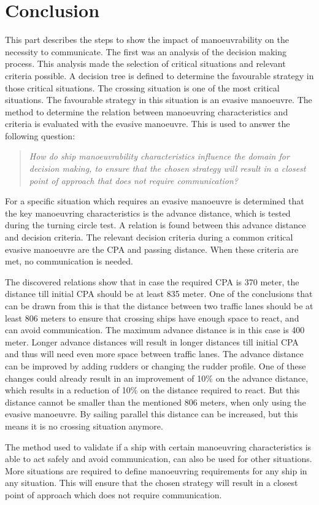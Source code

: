 \chapter{Conclusion}
This part describes the steps to show the impact of manoeuvrability on the necessity to communicate. The first was an analysis of the decision making process. This analysis made the selection of critical situations and relevant criteria possible.
A decision tree is defined to determine the favourable strategy in those critical situations. The crossing situation is one of the most critical situations. The favourable strategy in this situation is an evasive manoeuvre. The method to determine the relation between manoeuvring characteristics and criteria is evaluated with the evasive manoeuvre.
This is used to answer the following question:

\begin{quotation}
	\emph{How do ship manoeuvrability characteristics influence the domain for decision making, to ensure that the chosen strategy will result in a closest point of approach that does not require communication?} 
\end{quotation}

For a specific situation which requires an evasive manoeuvre is determined that the key manoeuvring characteristics is the advance distance, which is tested during the turning circle test. A relation is found between this advance distance and decision criteria. The relevant decision criteria during a common critical evasive manoeuvre are the \acf{CPA} and passing distance. When these criteria are met, no communication is needed.

The discovered relations show that in case the required \ac{CPA} is 370 meter, the distance till initial CPA should be at least 835 meter. One of the conclusions that can be drawn from this is that the distance between two traffic lanes should be at least 806 meters to ensure that crossing ships have enough space to react, and can avoid communication.
The maximum advance distance is in this case is 400 meter. Longer advance distances will result in longer distances till initial CPA and thus will need even more space between traffic lanes. The advance distance can be improved by adding rudders or changing the rudder profile. One of these changes could already result in an improvement of 10\% on the advance distance, which results in a reduction of 10\% on the distance required to react. But this distance cannot be smaller than the mentioned 806 meters, when only using the evasive manoeuvre. By sailing parallel this distance can be increased, but this means it is no crossing situation anymore.

The method used to validate if a ship with certain manoeuvring characteristics is able to act safely and avoid communication, can also be used for other situations. More situations are required to define manoeuvring requirements for any ship in any situation. This will ensure that the chosen strategy will result in a closest point of approach which does not require communication.